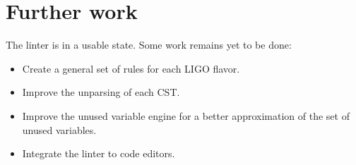 \documentclass[10pt,a4paper]{article}
\begin{document}
\section{Further work}
The linter is in a usable state. Some work remains yet to be done:
\begin{itemize}
\item Create a general set of rules for each LIGO flavor.
\item Improve the unparsing of each CST.
\item Improve the unused variable engine for a better approximation of the set of unused variables.
\item Integrate the linter to code editors.
\end{itemize}


{}
\end{document}
